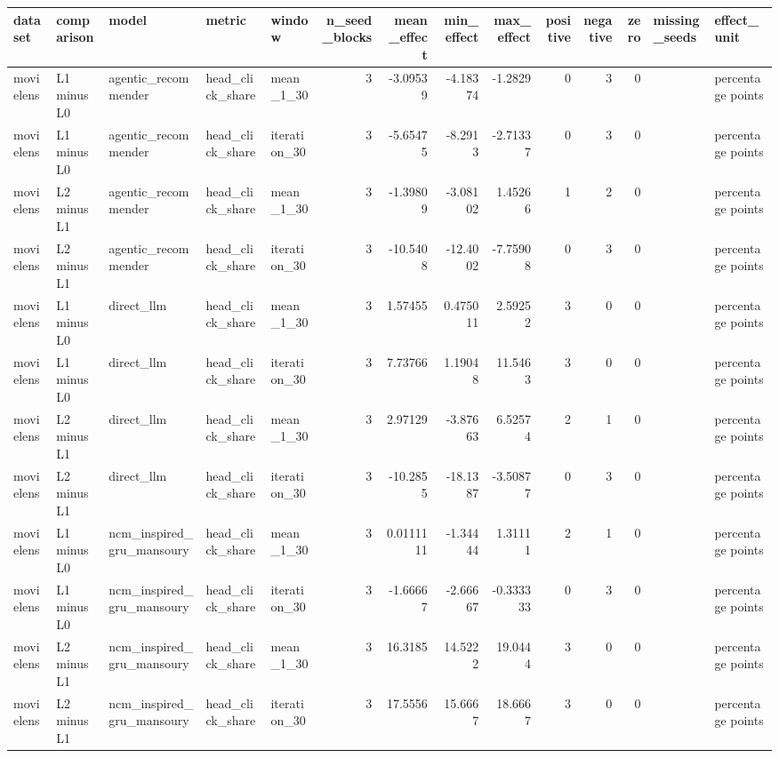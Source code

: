 \begin{table}[htbp!]
\centering
\small
\setlength{\tabcolsep}{3pt}
\renewcommand{\arraystretch}{1.1}
\begin{tabular}{lllllrrrrrrrll}
\hline
dataset & comparison & model & metric & window & n\_seed\_blocks & mean\_effect & min\_effect & max\_effect & positive & negative & zero & missing\_seeds & effect\_unit \\
\hline
movielens & L1 minus L0 & agentic\_recommender & head\_click\_share & mean\_1\_30 & 3 & -3.09539 & -4.18374 & -1.2829 & 0 & 3 & 0 &  & percentage points \\
movielens & L1 minus L0 & agentic\_recommender & head\_click\_share & iteration\_30 & 3 & -5.65475 & -8.2913 & -2.71337 & 0 & 3 & 0 &  & percentage points \\
movielens & L2 minus L1 & agentic\_recommender & head\_click\_share & mean\_1\_30 & 3 & -1.39809 & -3.08102 & 1.45266 & 1 & 2 & 0 &  & percentage points \\
movielens & L2 minus L1 & agentic\_recommender & head\_click\_share & iteration\_30 & 3 & -10.5408 & -12.4002 & -7.75908 & 0 & 3 & 0 &  & percentage points \\
movielens & L1 minus L0 & direct\_llm & head\_click\_share & mean\_1\_30 & 3 & 1.57455 & 0.475011 & 2.59252 & 3 & 0 & 0 &  & percentage points \\
movielens & L1 minus L0 & direct\_llm & head\_click\_share & iteration\_30 & 3 & 7.73766 & 1.19048 & 11.5463 & 3 & 0 & 0 &  & percentage points \\
movielens & L2 minus L1 & direct\_llm & head\_click\_share & mean\_1\_30 & 3 & 2.97129 & -3.87663 & 6.52574 & 2 & 1 & 0 &  & percentage points \\
movielens & L2 minus L1 & direct\_llm & head\_click\_share & iteration\_30 & 3 & -10.2855 & -18.1387 & -3.50877 & 0 & 3 & 0 &  & percentage points \\
movielens & L1 minus L0 & ncm\_inspired\_gru\_mansoury & head\_click\_share & mean\_1\_30 & 3 & 0.0111111 & -1.34444 & 1.31111 & 2 & 1 & 0 &  & percentage points \\
movielens & L1 minus L0 & ncm\_inspired\_gru\_mansoury & head\_click\_share & iteration\_30 & 3 & -1.66667 & -2.66667 & -0.333333 & 0 & 3 & 0 &  & percentage points \\
movielens & L2 minus L1 & ncm\_inspired\_gru\_mansoury & head\_click\_share & mean\_1\_30 & 3 & 16.3185 & 14.5222 & 19.0444 & 3 & 0 & 0 &  & percentage points \\
movielens & L2 minus L1 & ncm\_inspired\_gru\_mansoury & head\_click\_share & iteration\_30 & 3 & 17.5556 & 15.6667 & 18.6667 & 3 & 0 & 0 &  & percentage points \\

\end{tabular}
\end{table}
